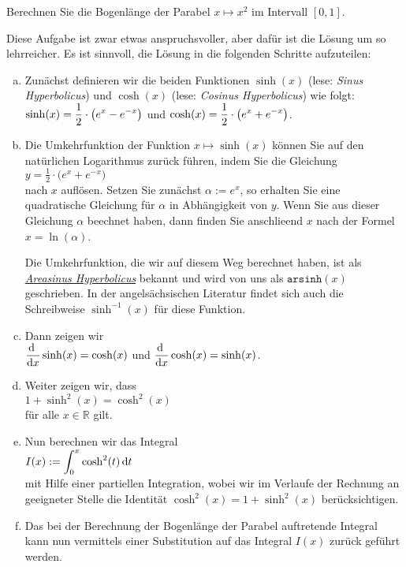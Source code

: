 \exercise
Berechnen Sie die Bogenl\"ange der Parabel $x \mapsto x^2$ im Intervall $[0,1]$. 

\hint
Diese Aufgabe ist zwar etwas anspruchsvoller, aber daf\"ur ist die L\"osung um so lehrreicher.  Es ist
sinnvoll, die L\"osung in die folgenden Schritte aufzuteilen:
\begin{enumerate}[(a)]
\item Zun\"achst definieren wir die beiden Funktionen $\sinh(x)$ (lese: \emph{Sinus Hyperbolicus}) und
      $\cosh(x)$ (lese: \emph{Cosinus Hyperbolicus}) wie folgt:
      \\[0.2cm]
      \hspace*{1.3cm}
      $\displaystyle\sinh(x) = \frac{1}{2} \cdot \bigl(e^x - e^{-x}\bigr)$ \quad und \quad
      $\displaystyle\cosh(x) = \frac{1}{2} \cdot \bigl(e^x + e^{-x}\bigr)$. 
\item Die Umkehrfunktion der Funktion $x \mapsto \sinh(x)$ k\"onnen Sie auf den nat\"urlichen
      Logarithmus zur\"uck f\"uhren, indem Sie die Gleichung
      \\[0.2cm]
      \hspace*{1.3cm}
      $y = \frac{1}{2} \cdot \bigl(e^x + e^{-x}\bigr)$
      \\[0.2cm]
      nach $x$ aufl\"osen.  Setzen Sie zun\"achst $\alpha := e^x$, so erhalten Sie eine quadratische
      Gleichung f\"ur $\alpha$ in Abh\"angigkeit von $y$.  Wenn Sie aus dieser Gleichung $\alpha$
      beechnet haben, dann finden Sie anschlie\3end $x$ nach der Formel $x = \ln(\alpha)$.

      Die Umkehrfunktion, die wir auf diesem Weg berechnet haben, ist als 
      \href{https://de.wikipedia.org/wiki/Areasinus_Hyperbolicus_und_Areakosinus_Hyperbolicus}{\emph{Areasinus Hyperbolicus}}
      bekannt und wird von uns als $\mathtt{arsinh}(x)$ geschrieben.  In der angels\"achsischen
      Literatur findet sich auch die Schreibweise $\sinh^{-1}(x)$ f\"ur diese Funktion.
\item Dann zeigen wir
      \\[0.2cm]
      \hspace*{1.3cm}
      $\displaystyle\frac{\textrm{d}\;}{\textrm{d}x} \sinh(x) = \cosh(x)$ \quad und \quad $\displaystyle\frac{\textrm{d}\;}{\textrm{d}x} \cosh(x) = \sinh(x)$.
\item Weiter zeigen wir, dass
      \\[0.2cm]
      \hspace*{1.3cm}
      $1 + \sinh^2(x) = \cosh^2(x)$
      \\[0.2cm]
      f\"ur alle $x\in \mathbb{R}$ gilt.
\item Nun berechnen wir das Integral
      \\[0.2cm]
      \hspace*{1.3cm}
      $\displaystyle I(x) := \int_0^x \cosh^2(t)\, \textrm{d} t$
      \\[0.2cm]
      mit Hilfe einer partiellen Integration, wobei wir im Verlaufe der Rechnung an geeigneter
      Stelle die Identit\"at $\cosh^2(x) = 1 + \sinh^2(x)$ ber\"ucksichtigen. 
\item Das bei der Berechnung der Bogenl\"ange der Parabel auftretende Integral kann nun vermittels einer
      Substitution auf das Integral $I(x)$ zur\"uck gef\"uhrt werden. \eod 
\end{enumerate}


